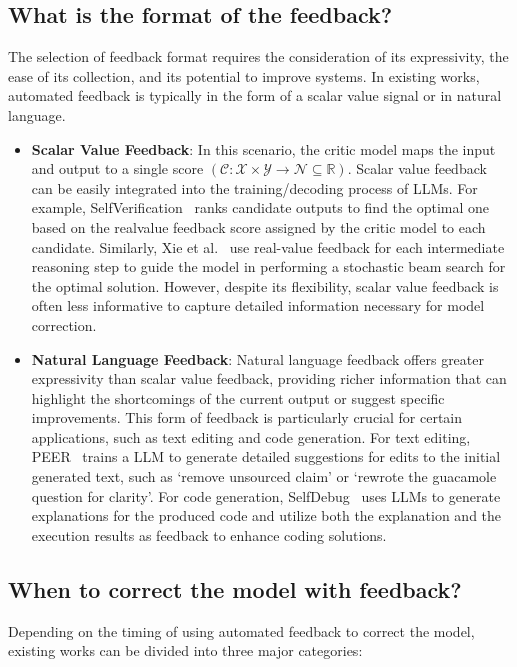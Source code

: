 \documentclass[a4paper,oneside]{book}
\begin{document}
\subsection{What is the format of the feedback?}
The selection of feedback format requires the consideration of its expressivity, the ease of its collection, and its potential to improve systems. In existing works, automated feedback is typically in the form of a scalar value signal or in natural language.

\begin{itemize}
  \item \textbf{Scalar Value Feedback}: In this scenario, the critic model maps the input and output to a single score $(\mathcal{C}: \mathcal{X} \times \mathcal{Y} \rightarrow \mathcal{N} \subseteq \mathbb{R})$. Scalar value feedback can be easily integrated into the training/decoding process of LLMs. For example, SelfVerification~\cite{weng2023large} ranks candidate outputs to find the optimal one based on the realvalue feedback score assigned by the critic model to each candidate. Similarly, Xie et al.~\cite{xie2023selfevaluation} use real-value feedback for each intermediate reasoning step to guide the model in performing a stochastic beam search for the optimal solution. However, despite its flexibility, scalar value feedback is often less informative to capture detailed information necessary for model correction.

  \item \textbf{Natural Language Feedback}: Natural language feedback offers greater expressivity than scalar value feedback, providing richer information that can highlight the shortcomings of the current output or suggest specific improvements. This form of feedback is particularly crucial for certain applications, such as text editing and code generation. For text editing, PEER~\cite{schick2022peer} trains a LLM to generate detailed suggestions for edits to the initial generated text, such as `remove unsourced claim' or `rewrote the guacamole question for clarity'. For code generation, SelfDebug~\cite{chen2023teaching} uses LLMs to generate explanations for the produced code and utilize both the explanation and the execution results as feedback to enhance coding solutions.
\end{itemize}

\subsection{When to correct the model with feedback?}
Depending on the timing of using automated feedback to correct the model, existing works can be divided into three major categories:
\end{document}
